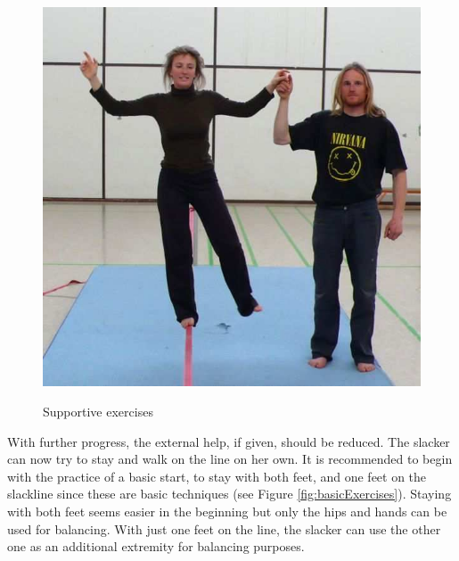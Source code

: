 \begin{figure}[htb]
\begin{minipage}[t]{0.37\linewidth}
		\label{fig:slacklineHelpBar}
	\end{minipage}
	\hfill
	\begin{minipage}[t]{0.3\linewidth}
		\centering
		\includegraphics[width=1\linewidth]{Pictures/slacklineHelpHuman}
		\label{fig:slacklineHelpHuman}
	\end{minipage}
	\caption{Supportive exercises~\cite{Kroiss2007-ab}}
	\label{fig:supportiveExercises}
\end{figure}

With further progress, the external help, if given, should be reduced. The slacker can now try to stay and walk on the line on her own. It is recommended to begin with the practice of a basic start, to stay with both feet, and one feet on the slackline since these are basic techniques (see Figure \ref{fig:basicExercises}). Staying with both feet seems easier in the beginning but only the hips and hands can be used for balancing. With just one feet on the line, the slacker can use the other one as an additional extremity for balancing purposes.

